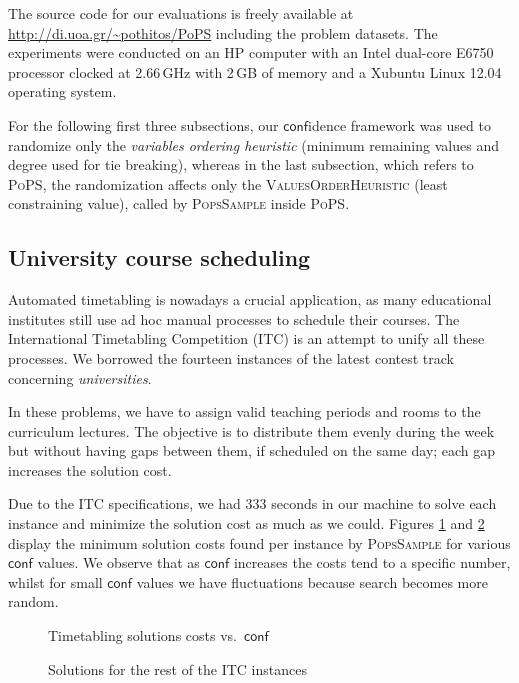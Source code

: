 \documentclass{ws-ijait}
\begin{document}
The source code for our evaluations is freely available at
\url{http://di.uoa.gr/~pothitos/PoPS} including the problem
datasets. The experiments were conducted on an HP computer
with an Intel dual-core E6750 processor clocked at 2.66\,GHz
with 2\,GB of memory and a Xubuntu Linux 12.04 operating
system.

For the following first three subsections, our
$\mathsf{conf}$idence framework was used to randomize only
the \emph{variables ordering heuristic} (minimum remaining
values and degree used for tie breaking), whereas in the
last subsection, which refers to \textsc{PoPS}, the
randomization affects only the \textsc{ValuesOrderHeuristic}
(least constraining value), called by \textsc{PopsSample}
inside \textsc{PoPS}.

\subsection{University course scheduling\label{ITC}}

Automated timetabling is nowadays a crucial application, as
many educational institutes still use ad hoc manual
processes to schedule their courses. The International
Timetabling Competition (ITC) is an attempt to unify all
these processes. We borrowed the fourteen instances of the
latest contest track concerning
\emph{universities}.\cite{itc-agenda}

In these problems, we have to assign valid teaching periods
and rooms to the curriculum lectures. The objective is to
distribute them evenly during the week but without having
gaps between them, if scheduled on the same day; each gap
increases the solution cost.\cite{pothitos-ictai2012}

Due to the ITC specifications, we had 333 seconds in our
machine to solve each instance and minimize the solution
cost as much as we could. Figures \ref{costsA} and
\ref{costsB} display the minimum solution costs found per
instance by \textsc{PopsSample} for various $\mathsf{conf}$
values. We observe that as $\mathsf{conf}$ increases the
costs tend to a specific number, whilst for small
$\mathsf{conf}$ values we have fluctuations because search
becomes more random.

\begin{figure}
  \centering
  
  \caption{Timetabling solutions costs vs.\ 
           $\mathsf{conf}$\label{costsA}}
\end{figure}

\begin{figure}
  \centering
  
  \caption{Solutions for the rest of the ITC
           instances\label{costsB}}
\end{figure}
\end{document}
